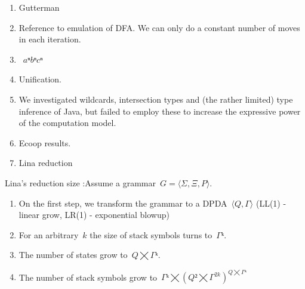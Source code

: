 \begin{enumerate}
  \item Gutterman
  \item Reference to emulation of DFA\@. We can only do
        a constant number of moves in each iteration.
  \item~$aⁿbⁿcⁿ$
  \item \Prolog Unification.
  \item We investigated wildcards, intersection types and
        (the rather limited) type inference of 
        Java, but failed to employ these to increase the expressive power of the computation model.
  \item Ecoop results.
  \item Lina reduction
\end{enumerate}

Lina's reduction size :Assume a grammar~$G=⟨Σ,Ξ,P⟩$.
\begin{enumerate}
  \item On the first step, we transform the grammar to a DPDA~$⟨Q,Γ⟩$ (LL(1) - linear grow, LR(1) - exponential blowup)
  \item For an arbitrary~$k$ the size of stack symbols turns to~$Γᵏ$.
  \item The number of states grow to~$Q⨉Γᵏ$.
  \item The number of stack symbols grow to~$Γᵏ⨉(Q²⨉Γ^{2k})^{Q⨉Γᵏ}$
\end{enumerate}
